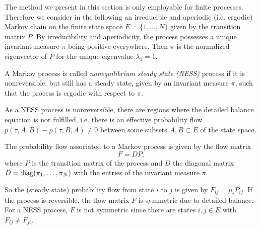 The method we present in this section is only employable for finite processes.
Therefore we consider in the following an irreducible and aperiodic (i.e. ergodic) Markov chain on the finite state space $E = \{1,\dots,N\}$ given by the transition matrix $P$. By irreducibility and aperiodicity, the process possesses a unique invariant measure $\pi$ being positive everywhere. %
Then $\pi$ is the normalized eigenvector of $P$ for the unique eigenvalue $\lambda_1 = 1$. 


\begin{defi}
A Markov process is called \textit{nonequilibrium steady state (NESS)} process if it is nonreversible, but still has a steady state, given by an invariant measure $\pi$, such that the process is ergodic with respect to $\pi$.
\end{defi}

As a NESS process is nonreversible, there are regions where the detailed balance equation is not fulfilled, i.e. there is an effective probability flow $p(\tau, A, B) - p(\tau,B,A) \neq 0$ between some subsets $A,B \subset E$ of the state space.

\begin{defi}
The probability flow associated to a Markov process is given by the flow matrix
\begin{equation*}
F = DP,
\end{equation*}
where $P$ is the transition matrix of the process and $D$ the diagonal matrix $D = \mathrm{diag} (\pi_1, \dots, \pi_N)$ with the entries of the invariant measure $\pi$.
\end{defi}
So the (steady state) probability flow from state $i$ to $j$ is given by $F_{ij} = \mu_i P_{ij}$.
If the process is reversible, the flow matrix $F$ is symmetric due to detailed balance. For a NESS process, $F$ is not symmetric since there are states $i,j \in E$ with $F_{ij} \neq F_{ji}$.
\newpage



